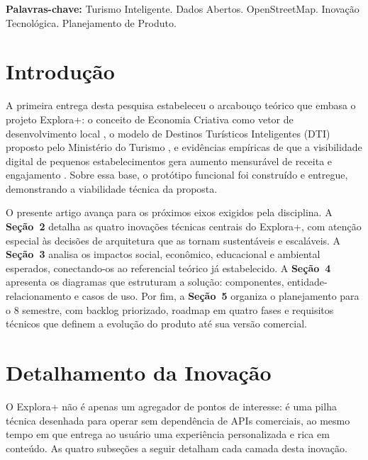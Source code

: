 \documentclass[12pt, a4paper]{article}
\begin{document}
\vspace{0.4cm}
\noindent\textbf{Palavras-chave:} Turismo Inteligente. Dados Abertos. OpenStreetMap. Inova\c{c}\~ao Tecnol\'ogica. Planejamento de Produto.

\vspace{0.8cm}

\section{Introdu\c{c}\~ao}

A primeira entrega desta pesquisa estabeleceu o arcabou\c{c}o te\'orico que embasa o projeto Explora+: o conceito de Economia Criativa como vetor de desenvolvimento local \parencite{silva2020}, o modelo de Destinos Tur\'isticos Inteligentes (DTI) proposto pelo Minist\'erio do Turismo \parencite{brasil2022}, e evid\^encias emp\'iricas de que a visibilidade digital de pequenos estabelecimentos gera aumento mensur\'avel de receita \parencite{luca2022} e engajamento \parencite{shankar2025}. Sobre essa base, o prot\'otipo funcional foi constru\'ido e entregue, demonstrando a viabilidade t\'ecnica da proposta.

O presente artigo avan\c{c}a para os pr\'oximos eixos exigidos pela disciplina. A \textbf{Se\c{c}\~ao~2} detalha as quatro inova\c{c}\~oes t\'ecnicas centrais do Explora+, com aten\c{c}\~ao especial \`as decis\~oes de arquitetura que as tornam sustent\'aveis e escal\'aveis. A \textbf{Se\c{c}\~ao~3} analisa os impactos social, econ\^omico, educacional e ambiental esperados, conectando-os ao referencial te\'orico j\'a estabelecido. A \textbf{Se\c{c}\~ao~4} apresenta os diagramas que estruturam a solu\c{c}\~ao: componentes, entidade-relacionamento e casos de uso. Por fim, a \textbf{Se\c{c}\~ao~5} organiza o planejamento para o 8\textordmasculine{} semestre, com backlog priorizado, roadmap em quatro fases e requisitos t\'ecnicos que definem a evolu\c{c}\~ao do produto at\'e sua vers\~ao comercial.

\section{Detalhamento da Inova\c{c}\~ao}

O Explora+ n\~ao \'e apenas um agregador de pontos de interesse: \'e uma pilha t\'ecnica desenhada para operar sem depend\^encia de APIs comerciais, ao mesmo tempo em que entrega ao usu\'ario uma experi\^encia personalizada e rica em conte\'udo. As quatro subse\c{c}\~oes a seguir detalham cada camada desta inova\c{c}\~ao.
\end{document}
